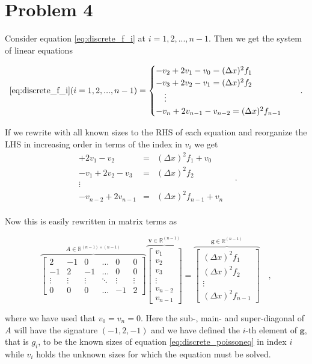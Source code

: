 \documentclass[final, 3p, times, 11.5pt]{article}
\begin{document}
\section*{Problem 4}



Consider equation \eqref{eq:discrete_f_i} at $i=1,2, ..., n-1$. Then we get the system of linear equations

$$
\eqref{eq:discrete_f_i}(i=1,2, ..., n-1) = 
\begin{cases}
-v_2 + 2v_1 - v_0    =  (\Delta x)^{2} f_1 \\
-v_3 + 2v_2 - v_1   =  (\Delta x)^{2} f_2 \\
\quad \vdots  \\
-v_n + 2v_{n-1} - v_{n-2}  =  (\Delta x)^{2} f_{n-1}
\end{cases}
\quad .
$$

If we rewrite with all known sizes to the RHS of each equation and reorganize the LHS in increasing order in terms of the index in $v_i$ we get
$$
\begin{matrix}
+2v_1 - v_2  & = & (\Delta x)^{2} f_1 + v_0 \\
-v_1 + 2v_2 - v_3 & = &  (\Delta x)^{2} f_2 \\
\vdots \\
-v_{n-2} + 2v_{n-1} &= &  (\Delta x)^{2} f_{n-1} + v_n \\
\end{matrix} \quad .
$$

Now this is easily rewritten in matrix terms as

$$
\overbrace{
    \begin{bmatrix}
    2 & -1 & 0 & \dots & 0  & 0 \\
    -1 & 2 & -1 & \dots & 0 & 0 \\
    \vdots & \vdots & \vdots &  \ddots & \vdots  & \vdots\\
    0 & 0 & 0 & \dots & -1 & 2 
    \end{bmatrix}
    }^{A\in \mathbb{R}^{(n-1)\times(n-1)}}
\overbrace{
    \begin{bmatrix}
    v_1 \\ v_2 \\ v_3 \\ \vdots \\ v_{n-2} \\ v_{n-1}
    \end{bmatrix}
    }^{\mathbf{v}\in \mathbb{R}^{(n-1)}}
= 
\overbrace{
    \begin{bmatrix}
    (\Delta x)^{2} f_1 \\
    (\Delta x)^{2} f_2 \\
    \vdots \\
    (\Delta x)^{2} f_{n-1} 
    \end{bmatrix}
    }^{\mathbf{g}\in\mathbb{R}^{(n-1)}} \quad ,
$$

where we have used that $v_0 = v_n = 0$. Here the sub-, main- and super-diagonal of $A$ will have the signature $(-1, 2, -1)$ and we have defined the $i$-th element of $\mathbf{g}$, that is $g_i$, to be the known sizes of equation \eqref{eq:discrete_poissoneq} in index $i$ while $v_i$ holds the unknown sizes for which the equation must be solved.
\end{document}
